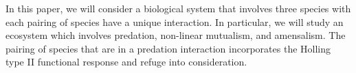 In this paper, we will consider a biological system that involves three species with each pairing of species have a unique interaction. In particular, we will study an ecosystem which involves predation, non-linear mutualism, and amensalism. The pairing of species that are in a predation interaction incorporates the Holling type II functional response and refuge into consideration.